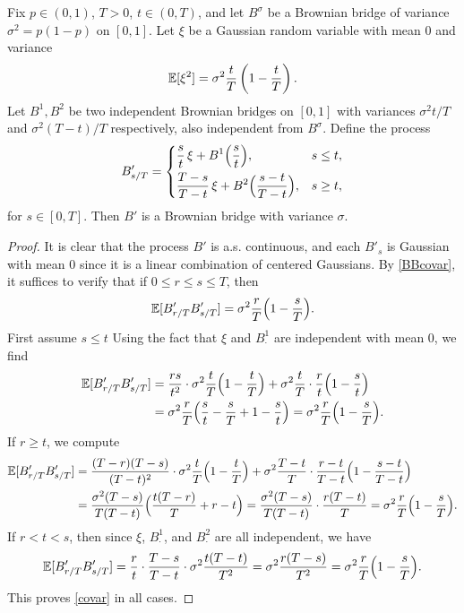 \begin{lemma}\label{2bridges}
	Fix $p\in (0,1)$, $T>0$, $t\in(0,T)$, and let $B^\sigma$ be a Brownian bridge of variance $\sigma^2 = p(1-p)$ on $[0,1]$. Let $\xi$ be a Gaussian random variable with mean 0 and variance
	\[
	\mathbb{E}[\xi^2] = \sigma^2\frac{t}{T}\left(1-\frac{t}{T}\right).
	\]
	Let $B^1,B^2$ be two independent Brownian bridges on $[0,1]$ with variances $\sigma^2 t/T$ and $\sigma^2(T-t)/T$ respectively, also independent from $B^\sigma$. Define the process
	\[
	B'_{s/T} = \begin{dcases}
	\frac{s}{t}\,\xi + B^1\Big(\frac{s}{t}\Big), & s\leq t,\\
	\frac{T-s}{T-t}\,\xi + B^2\Big(\frac{s-t}{T-t}\Big), & s\geq t,
	\end{dcases}
	\]
	for $s\in [0,T]$. Then $B'$ is a Brownian bridge with variance $\sigma$.
\end{lemma}

\begin{proof}
	It is clear that the process $B'$ is a.s. continuous, and each $B'_s$ is Gaussian with mean 0 since it is a linear combination of centered Gaussians. By \ref{BBcovar}, it suffices to verify that if $0\leq r\leq s\leq T$, then
	\begin{equation}\label{covar}
	\mathbb{E}[B'_{r/T}B'_{s/T}] = \sigma^2 \frac{r}{T}\Big(1-\frac{s}{T}\Big).
	\end{equation}
	First assume $s\leq t$ Using the fact that $\xi$ and $B^1_\cdot$ are independent with mean 0, we find
	\begin{align*}
	\mathbb{E}[B'_{r/T}B'_{s/T}] &= \frac{rs}{t^2}\cdot\sigma^2\frac{t}{T}\Big(1-\frac{t}{T}\Big) + \sigma^2\frac{t}{T}\cdot\frac{r}{t}\Big(1-\frac{s}{t}\Big)\\
	&= \sigma^2\frac{r}{T}\Big(\frac{s}{t} - \frac{s}{T} + 1 - \frac{s}{t}\Big) = \sigma^2\frac{r}{T}\Big(1-\frac{s}{T}\Big).
	\end{align*}
	If $r\geq t$, we compute
	\begin{align*}
	\mathbb{E}[B'_{r/T}B'_{s/T}] &= \frac{(T-r)(T-s)}{(T-t)^2}\cdot\sigma^2\frac{t}{T}\Big( 1 - \frac{t}{T}\Big) + \sigma^2\frac{T-t}{T}\cdot\frac{r-t}{T-t}\Big( 1 - \frac{s-t}{T-t}\Big)\\
	&= \frac{\sigma^2(T-s)}{T(T-t)}\Big(\frac{t(T-r)}{T} + r-t\Big) = \frac{\sigma^2(T-s)}{T(T-t)}\cdot\frac{r(T-t)}{T} = \sigma^2\frac{r}{T}\Big(1-\frac{s}{T}\Big).
	\end{align*}
	If $r < t < s$, then since $\xi$, $B^1_\cdot$, and $B^2_\cdot$ are all independent, we have
	\[
	\mathbb{E}[B_{r/T}'B_{s/T}'] = \frac{r}{t}\cdot\frac{T-s}{T-t}\cdot\sigma^2\frac{t(T-t)}{T^2} = \sigma^2\frac{r(T-s)}{T^2} = \sigma^2\frac{r}{T}\Big(1-\frac{s}{T}\Big).
	\]
	This proves \eqref{covar} in all cases.
\end{proof}

